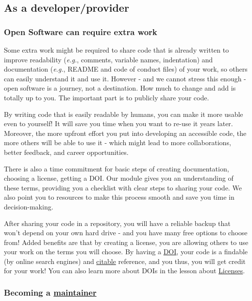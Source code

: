 \documentclass[
  letterpaper,
  DIV=11,
  numbers=noendperiod]{scrreport}
\begin{document}
\hypertarget{as-a-developerprovider-1}{%
\subsection{As a developer/provider}\label{as-a-developerprovider-1}}

\hypertarget{open-software-can-require-extra-work}{%
\subsubsection{Open Software can require extra
work}\label{open-software-can-require-extra-work}}

Some extra work might be required to share code that is already written
to improve readability (\emph{e.g.}, comments, variable names,
indentation) and documentation (\emph{e.g.}, README and code of conduct
files) of your work, so others can easily understand it and use it.
However - and we cannot stress this enough - open software is a journey,
not a destination. How much to change and add is totally up to you. The
important part is to publicly share your code.

By writing code that is easily readable by humans, you can make it more
usable even to yourself! It will save you time when you want to re-use
it years later. Moreover, the more upfront effort you put into
developing an accessible code, the more others will be able to use it -
which might lead to more collaborations, better feedback, and career
opportunities.

There is also a time commitment for basic steps of creating
documentation, choosing a license, getting a DOI. Our module gives you
an understanding of these terms, providing you a checklist with clear
steps to sharing your code. We also point you to resources to make this
process smooth and save you time in decision-making.

After sharing your code in a repository, you will have a reliable backup
that won't depend on your own hard drive - and you have many free
options to choose from! Added benefits are that by creating a license,
you are allowing others to use your work on the terms you will choose.
By having a \href{link}{DOI}, your code is a findable (by online search
engines) and \href{http://citeas.org}{citable} reference, and you thus,
you will get credit for your work! You can also learn more about DOIs in
the lesson about \href{link}{Licenses}.

\hypertarget{becoming-a-maintainer}{%
\subsubsection{\texorpdfstring{Becoming a
\href{vocab}{maintainer}}{Becoming a maintainer}}\label{becoming-a-maintainer}}
\end{document}

